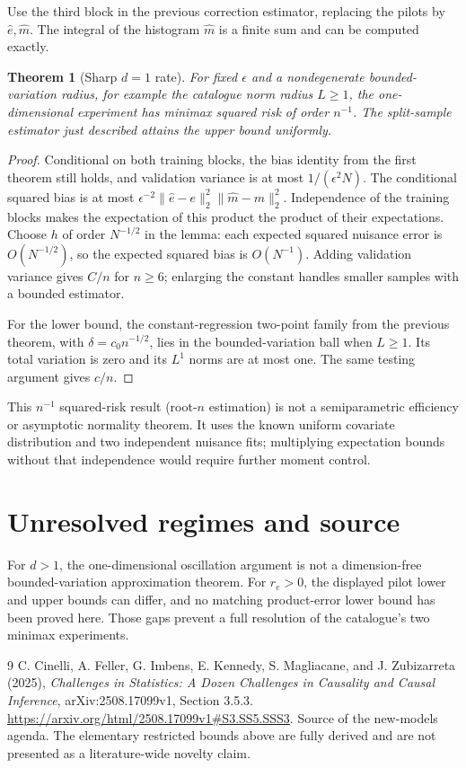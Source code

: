 \documentclass[11pt,a4paper]{article}
\newtheorem{theorem}{Theorem}[section]
\theoremstyle{definition}
\theoremstyle{remark}
\begin{document}
Use the third block in the previous correction estimator, replacing the pilots by $\widehat e,\widehat m$. The integral of the histogram $\widehat m$ is a finite sum and can be computed exactly.
\begin{theorem}[Sharp $d=1$ rate]
For fixed $\epsilon$ and a nondegenerate bounded-variation radius, for example the catalogue norm radius $L\ge1$, the one-dimensional experiment has minimax squared risk of order $n^{-1}$. The split-sample estimator just described attains the upper bound uniformly.
\end{theorem}
\begin{proof}
Conditional on both training blocks, the bias identity from the first theorem still holds, and validation variance is at most $1/(\epsilon^2N)$. The conditional squared bias is at most
$\epsilon^{-2}\|\widehat e-e\|_2^2\|\widehat m-m\|_2^2$.
Independence of the training blocks makes the expectation of this product the product of their expectations. Choose $h$ of order $N^{-1/2}$ in the lemma: each expected squared nuisance error is $O(N^{-1/2})$, so the expected squared bias is $O(N^{-1})$. Adding validation variance gives $C/n$ for $n\ge6$; enlarging the constant handles smaller samples with a bounded estimator.

For the lower bound, the constant-regression two-point family from the previous theorem, with $\delta=c_0n^{-1/2}$, lies in the bounded-variation ball when $L\ge1$. Its total variation is zero and its $L^1$ norms are at most one. The same testing argument gives $c/n$.
\end{proof}
This $n^{-1}$ squared-risk result (root-$n$ estimation) is not a semiparametric efficiency or asymptotic normality theorem. It uses the known uniform covariate distribution and two independent nuisance fits; multiplying expectation bounds without that independence would require further moment control.
\section{Unresolved regimes and source}
For $d>1$, the one-dimensional oscillation argument is not a dimension-free bounded-variation approximation theorem. For $r_e>0$, the displayed pilot lower and upper bounds can differ, and no matching product-error lower bound has been proved here. Those gaps prevent a full resolution of the catalogue's two minimax experiments.
\begin{thebibliography}{9}
 C. Cinelli, A. Feller, G. Imbens, E. Kennedy, S. Magliacane, and J. Zubizarreta (2025), \emph{Challenges in Statistics: A Dozen Challenges in Causality and Causal Inference}, arXiv:2508.17099v1, Section 3.5.3. \url{https://arxiv.org/html/2508.17099v1#S3.SS5.SSS3}. Source of the new-models agenda. The elementary restricted bounds above are fully derived and are not presented as a literature-wide novelty claim.
\end{thebibliography}
\end{document}

